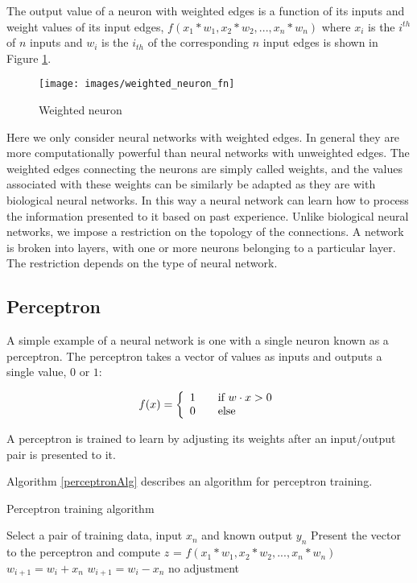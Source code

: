 The output value of a neuron with weighted edges is a function of its
inputs and weight values of its input edges, $f(x_1 * w_1, x_2 * w_2,
..., x_n * w_n)$ where $x_i$ is the $i^{th}$ of $n$ inputs and $w_i$
is the $i_{th}$ of the corresponding $n$ input edges  is shown in
Figure \ref{weighted_neuron}.

\begin{figure}[h!]
  \centering
  \texttt{[image: images/weighted\_neuron\_fn]}
  \caption{Weighted neuron}
  \label{weighted_neuron}
\end{figure}

Here we only consider neural networks with weighted edges. 
In general they are more computationally powerful than neural networks with unweighted edges.
The weighted edges connecting the neurons are simply called weights, and the values associated with these weights can be similarly be adapted as they are with biological neural networks. 
In this way a neural network can learn how to process the information presented to it based on past experience. 
Unlike biological neural networks, we impose a restriction on the topology of the connections.
A network is broken into layers, with one or more neurons belonging to a particular layer.
The restriction depends on the type of neural network.

\subsection{Perceptron}
A simple example of a neural network is one with a single neuron known as a perceptron.
The perceptron takes a vector of values as inputs and outputs a single value, $0$ or $1$:

\[
  f(x) = \left\{ 
  \begin{array}{l l}
    1 & \quad \text{if $w \cdot x > 0$}\\
    0 & \quad \text{else}\\
  \end{array} \right.
\]

A perceptron is trained to learn by adjusting its weights after an
input/output pair is presented to it.

Algorithm \ref{perceptronAlg} describes an algorithm for perceptron training.

\begin{algorithm}[h!]
\caption{Perceptron training algorithm}
\label{perceptronAlg}    
\begin{algorithmic}

\STATE Select a pair of training data, input $x_n$ and known output $y_n$
\STATE Present the vector to the perceptron and compute $z$ = $f(x_1 * w_1, x_2 * w_2, ..., x_n * w_n)$
\STATE $w_{i+1} = w_i + x_n$
\STATE $w_{i+1} = w_i - x_n$
 \ELSE
\STATE no adjustment
\ENDIF
\ENDWHILE
\end{algorithmic}
\end{algorithm}

